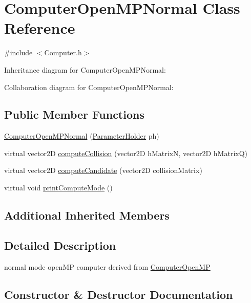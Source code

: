 \hypertarget{classComputerOpenMPNormal}{}\section{Computer\+Open\+M\+P\+Normal Class Reference}
\label{classComputerOpenMPNormal}


{\ttfamily \#include $<$Computer.\+h$>$}



Inheritance diagram for Computer\+Open\+M\+P\+Normal\+:


Collaboration diagram for Computer\+Open\+M\+P\+Normal\+:
\subsection*{Public Member Functions}
\begin{DoxyCompactItemize}
\item 
\hyperlink{classComputerOpenMPNormal_a88f384b38a3d4bbe9a6f2e3c4492a9f2}{Computer\+Open\+M\+P\+Normal} (\hyperlink{structParameterHolder}{Parameter\+Holder} ph)
\item 
virtual vector2D \hyperlink{classComputerOpenMPNormal_a27146489d3be8cce6767fc5942180859}{compute\+Collision} (vector2D h\+MatrixN, vector2D h\+MatrixQ)
\item 
virtual vector2D \hyperlink{classComputerOpenMPNormal_adbecd2ca2883633c4b977c1dc958d5b5}{compute\+Candidate} (vector2D collision\+Matrix)
\item 
virtual void \hyperlink{classComputerOpenMPNormal_a7ff74cba73a6099618314b30a923dc9b}{print\+Compute\+Mode} ()
\end{DoxyCompactItemize}
\subsection*{Additional Inherited Members}


\subsection{Detailed Description}
normal mode open\+MP computer derived from \hyperlink{classComputerOpenMP}{Computer\+Open\+MP} 

\subsection{Constructor \& Destructor Documentation}
